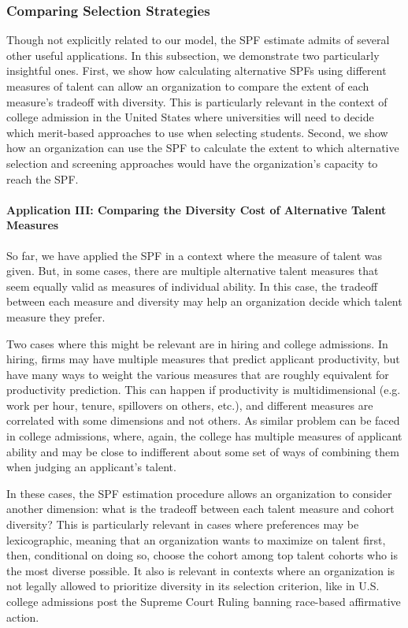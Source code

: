\subsubsection{Comparing Selection Strategies} \label{subsubsec:two_more_applications}
Though not explicitly related to our model, the SPF estimate admits of several other useful applications. In this subsection, we demonstrate two particularly insightful ones. First, we show how calculating alternative SPFs using different measures of talent can allow an organization to compare the extent of each measure's tradeoff with diversity. This is particularly relevant in the context of college admission in the United States where universities will need to decide which merit-based approaches to use when selecting students. Second, we show how an organization can use the SPF to calculate the extent to which alternative selection and screening approaches would have the organization's capacity to reach the SPF.

\paragraph{Application III: Comparing the Diversity Cost of Alternative Talent Measures}

So far, we have applied the SPF in a context where the measure of talent was given. But, in some cases, there are multiple alternative talent measures that seem equally valid as measures of individual ability. In this case, the tradeoff between each measure and diversity may help an organization decide which talent measure they prefer. 

Two cases where this might be relevant are in hiring and college admissions. In hiring, firms may have multiple measures that predict applicant productivity, but have many ways to weight the various measures that are roughly equivalent for productivity prediction. This can happen if productivity is multidimensional (e.g. work per hour, tenure, spillovers on others, etc.), and different measures are correlated with some dimensions and not others. As similar problem can be faced in college admissions, where, again, the college has multiple measures of applicant ability and may be close to indifferent about some set of ways of combining them when judging an applicant's talent. 

In these cases, the SPF estimation procedure allows an organization to consider another dimension: what is the tradeoff between each talent measure and cohort diversity? This is particularly relevant in cases where preferences may be lexicographic, meaning that an organization wants to maximize on talent first, then, conditional on doing so, choose the cohort among top talent cohorts who is the most diverse possible. It also is relevant in contexts where an organization is not legally allowed to prioritize diversity in its selection criterion, like in U.S. college admissions post the Supreme Court Ruling banning race-based affirmative action. 

